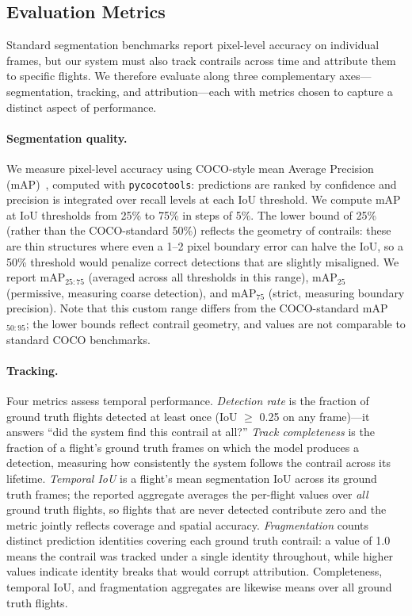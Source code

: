 \documentclass[1p,11pt]{elsarticle}
\begin{document}
\subsection{Evaluation Metrics}
\label{sec:metrics}

Standard segmentation benchmarks report pixel-level accuracy on individual frames, but our system must also track contrails across time and attribute them to specific flights. We therefore evaluate along three complementary axes---segmentation, tracking, and attribution---each with metrics chosen to capture a distinct aspect of performance.

\paragraph{Segmentation quality.} We measure pixel-level accuracy using COCO-style mean Average Precision (mAP)~\cite{lin2014coco}, computed with \texttt{pycocotools}: predictions are ranked by confidence and precision is integrated over recall levels at each IoU threshold. We compute mAP at IoU thresholds from 25\% to 75\% in steps of 5\%. The lower bound of 25\% (rather than the COCO-standard 50\%) reflects the geometry of contrails: these are thin structures where even a 1--2 pixel boundary error can halve the IoU, so a 50\% threshold would penalize correct detections that are slightly misaligned. We report mAP$_{25{:}75}$ (averaged across all thresholds in this range), mAP$_{25}$ (permissive, measuring coarse detection), and mAP$_{75}$ (strict, measuring boundary precision). Note that this custom range differs from the COCO-standard mAP$_{50{:}95}$; the lower bounds reflect contrail geometry, and values are not comparable to standard COCO benchmarks.

\paragraph{Tracking.} Four metrics assess temporal performance. \emph{Detection rate} is the fraction of ground truth flights detected at least once (IoU $\geq$ 0.25 on any frame)---it answers ``did the system find this contrail at all?'' \emph{Track completeness} is the fraction of a flight's ground truth frames on which the model produces a detection, measuring how consistently the system follows the contrail across its lifetime. \emph{Temporal IoU} is a flight's mean segmentation IoU across its ground truth frames; the reported aggregate averages the per-flight values over \emph{all} ground truth flights, so flights that are never detected contribute zero and the metric jointly reflects coverage and spatial accuracy. \emph{Fragmentation} counts distinct prediction identities covering each ground truth contrail: a value of 1.0 means the contrail was tracked under a single identity throughout, while higher values indicate identity breaks that would corrupt attribution. Completeness, temporal IoU, and fragmentation aggregates are likewise means over all ground truth flights.
\end{document}
